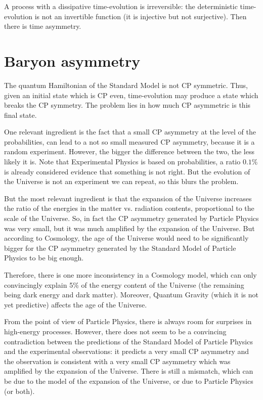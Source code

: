 \documentclass[11pt]{book}
\begin{document}
A process with a dissipative time-evolution is irreversible: the
deterministic time-evolution is not an invertible function (it is
injective but not surjective). Then there is time asymmetry.

\hypertarget{baryon-asymmetry}{%
\section{Baryon asymmetry}\label{baryon-asymmetry}}

The quantum Hamiltonian of the Standard Model is not CP symmetric. Thus,
given an initial state which is CP even, time-evolution may produce a
state which breaks the CP symmetry. The problem lies in how much CP
asymmetric is this final state.

One relevant ingredient is the fact that a small CP asymmetry at the
level of the probabilities, can lead to a not so small measured CP
asymmetry, because it is a random experiment. However, the bigger the
difference between the two, the less likely it is. Note that
Experimental Physics is based on probabilities, a ratio \(0.1\%\) is
already considered evidence that something is not right. But the
evolution of the Universe is not an experiment we can repeat, so this
blurs the problem.

But the most relevant ingredient is that the expansion of the Universe
increases the ratio of the energies in the matter vs. radiation
contents, proportional to the scale of the Universe. So, in fact the CP
asymmetry generated by Particle Physics was very small, but it was much
amplified by the expansion of the Universe. But according to Cosmology,
the age of the Universe would need to be significantly bigger for the CP
asymmetry generated by the Standard Model of Particle Physics to be big
enough.

Therefore, there is one more inconsistency in a Cosmology model, which
can only convincingly explain 5\% of the energy content of the Universe
(the remaining being dark energy and dark matter). Moreover, Quantum
Gravity (which it is not yet predictive) affects the age of the
Universe.

From the point of view of Particle Physics, there is always room for
surprises in high-energy processes. However, there does not seem to be a
convincing contradiction between the predictions of the Standard Model
of Particle Physics and the experimental observations: it predicts a
very small CP asymmetry and the observation is consistent with a very
small CP asymmetry which was amplified by the expansion of the Universe.
There is still a mismatch, which can be due to the model of the
expansion of the Universe, or due to Particle Physics (or both).
\end{document}
